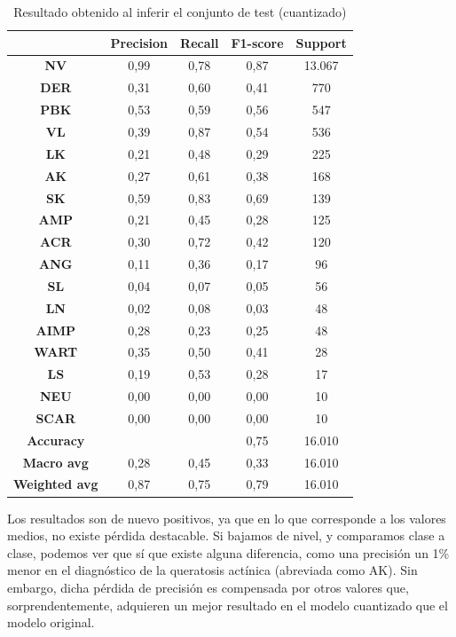 \begin{table}[H]
	\centering
	\begin{tabular}{|c|c|c|c|c|}
		\hline
		~ & \textbf{Precision} & \textbf{Recall} &\textbf{F1-score} & \textbf{Support} \\ \hline
		\textbf{NV} & 0,99 & 0,78 & 0,87 & 13.067 \\ 
		\textbf{DER} & 0,31 & 0,60 & 0,41 & 770 \\ 
		\textbf{PBK} & 0,53 & 0,59 & 0,56 & 547 \\ 
		\textbf{VL} & 0,39 & 0,87 & 0,54 & 536 \\ 
		\textbf{LK} & 0,21 & 0,48 & 0,29 & 225 \\ 
		\textbf{AK} & 0,27 & 0,61 & 0,38 & 168 \\ 
		\textbf{SK} & 0,59 & 0,83 & 0,69 & 139 \\ 
		\textbf{AMP} & 0,21 & 0,45 & 0,28 & 125 \\ 
		\textbf{ACR} & 0,30 & 0,72 & 0,42 & 120 \\ 
		\textbf{ANG} & 0,11 & 0,36 & 0,17 & 96 \\ 
		\textbf{SL} & 0,04 & 0,07 & 0,05 & 56 \\ 
		\textbf{LN} & 0,02 & 0,08 & 0,03 & 48 \\ 
		\textbf{AIMP} & 0,28 & 0,23 & 0,25 & 48 \\ 
		\textbf{WART} & 0,35 & 0,50 & 0,41 & 28 \\ 
		\textbf{LS} & 0,19 & 0,53 & 0,28 & 17 \\ 
		\textbf{NEU} & 0,00 & 0,00 & 0,00 & 10 \\ 
		\textbf{SCAR} & 0,00 & 0,00 & 0,00 & 10 \\ \hline
		\textbf{Accuracy} & ~ & ~ & 0,75 & 16.010 \\ \hline
		\textbf{Macro avg} & 0,28 & 0,45 & 0,33 & 16.010 \\ 
		\textbf{Weighted avg} & 0,87 & 0,75 & 0,79 & 16.010 \\ \hline
	\end{tabular}
	\caption{Resultado obtenido al inferir el conjunto de test (cuantizado)}
	\label{tab:testbenquant}
\end{table}

Los resultados son de nuevo positivos, ya que en lo que corresponde a los valores medios, no existe pérdida destacable. Si bajamos de nivel, y comparamos clase a clase, podemos ver que sí que existe alguna diferencia, como  una precisión un 1\% menor en el diagnóstico de la queratosis actínica (abreviada como AK). Sin embargo, dicha pérdida de precisión es compensada por otros valores que, sorprendentemente, adquieren un mejor resultado en el modelo cuantizado que el modelo original.

